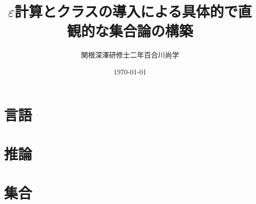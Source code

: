 \documentclass[a4j,10.5pt,oneside,openany]{jsbook}
\title{$\varepsilon$計算とクラスの導入による具体的で直観的な集合論の構築}
\author{関根深澤研修士二年百合川尚学}
\date{\today}
\theoremstyle{mystyle}
\begin{document}
\maketitle
\tableofcontents
\frontmatter
\mainmatter

%


\chapter{言語}
	
	
	

\chapter{推論}
\label{chap:inference}
	
	
	
	
	

\chapter{集合}	
	
	
	
	
	
	
	
	
	
	
	
	
	
	
	
	
	
	
	
\end{document}
